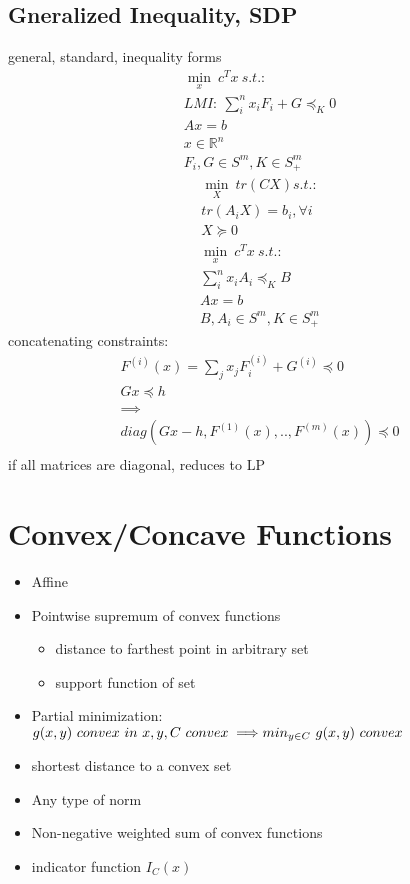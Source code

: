\documentclass[8pt]{extarticle}
\newcommand{\R}{\mathbb{R}}
\begin{document}
\begin{multicols*}{2}
  \subsection*{Gneralized Inequality, SDP}
  general, standard, inequality forms
  \begin{align*}
    \min_x\ c^Tx\ s.t.:\\
    LMI:\ \sum_i^n x_i F_i + G \preceq_K 0\\
    Ax=b\\
    x\in\R^n\\
    F_i,G \in S^m, K\in S_+^m
  \end{align*}
  \begin{align*}
    \min_X\ tr(CX) s.t.:\\
    tr(A_iX)=b_i, \forall i\\
    X \succeq 0
  \end{align*}
  \begin{align*}
    \min_x\ c^Tx\ s.t.:\\
    \sum_i^n x_i A_i \preceq_K B\\
    Ax=b\\
    B,A_i \in S^m, K\in S_+^m
  \end{align*}
  concatenating constraints:
  \begin{align*}
    F^{(i)}(x) = \sum_j x_j F_i^{(i)} + G^{(i)} \preceq 0\\
    Gx \preceq h\\
    \implies\\
    diag(Gx-h, F^{(1)}(x),..,F^{(m)}(x)) \preceq 0\\
  \end{align*}  
  if all matrices are diagonal, reduces to LP

  \vfill\null
  \pagebreak

  \section{Convex/Concave Functions}

  \begin{itemize}
  \item Affine
  \item Pointwise supremum of convex functions
    \begin{itemize}
    \item distance to farthest point in arbitrary set
    \item support function of set
    \end{itemize}
  \item Partial minimization:\\
    $g(x,y)\ convex\ in\ x,y, C\ convex \implies\\ min_{y\in C}\ g(x,y)\ convex$
  \item shortest distance to a convex set
  \item Any type of norm
  \item Non-negative weighted sum of convex functions
  \item indicator function $I_C(x)$
  \end{itemize}
  

\end{multicols*}
\end{document}
